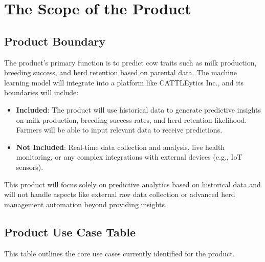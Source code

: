 \documentclass[12pt]{article}
\newcommand{\lips}{\textit{Insert your content here.}}
\begin{document}

\section{The Scope of the Product}

\subsection{Product Boundary}
The product's primary function is to predict cow traits such as milk production, 
breeding success, and herd retention based on parental data. The machine learning 
model will integrate into a platform like CATTLEytics Inc., and its 
boundaries will include:

\begin{itemize}
    \item \textbf{Included}: The product will use historical data to generate 
    predictive insights on milk production, breeding success rates, and herd 
    retention likelihood. Farmers will be able to input relevant data to 
    receive predictions.
    \item \textbf{Not Included}: Real-time data collection and analysis, 
    live health monitoring, or any complex integrations with external devices 
    (e.g., IoT sensors).
\end{itemize}

This product will focus solely on predictive analytics based on historical data 
and will not handle aspects like external raw data collection or advanced herd management 
automation beyond providing insights.

\subsection{Product Use Case Table}
This table outlines the core use cases currently identified for the product.
\end{document}

